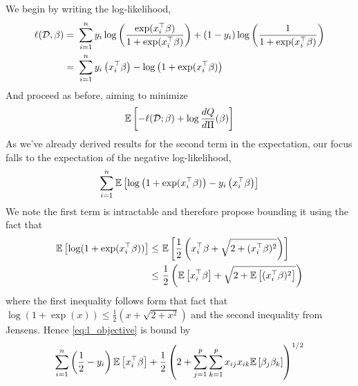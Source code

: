 \documentclass[12pt]{article}
\begin{document}
We begin by writing the log-likelihood,
\begin{align}
    \ell(\mathcal{D}, \beta) =&\ \sum_{i=1}^n 
    y_i \log \left( \frac{ \exp(x_i^\top \beta) }{ 1 + \exp( x_i^\top \beta ) } \right) +
    (1 - y_i) \log \left( \frac{ 1 }{ 1 + \exp( x_i^\top \beta ) } \right) \nonumber \\
    =&\ \sum_{i=1}^n  y_i \left( x_i^\top \beta \right) - \log \left(1 + \exp(x_i^\top \beta) \right)
\end{align}
And proceed as before, aiming to minimize
\begin{equation} \label{eq:l_opt_objective} 
    \mathbb{E} \left[ 
	- \ell(\mathcal{D}; \beta) + \log \frac{dQ}{d\Pi}(\beta) 
    \right]
\end{equation}
As we've already derived results for the second term in the expectation, our focus falls to the expectation of the negative log-likelihood,
\begin{equation} \label{eq:l_objective} 
    \sum_{i=1}^n  
    \mathbb{E} \left[
	    \log \left(1 + \exp(x_i^\top \beta) \right) -
	    y_i \left( x_i^\top \beta \right) 
    \right]
\end{equation}
We note the first term is intractable and therefore propose bounding it using the fact that
\begin{equation}
\begin{aligned}
    \mathbb{E} \left[ \log(1 + \exp(x_i^\top \beta)) \right]
    \leq &\
	\mathbb{E} \left[ 
	    \frac{1}{2} \left( x_i^\top \beta + 
	    \sqrt{2 + (x_i^\top \beta)^2} \right) 
	\right] \\
    \leq &\
	\frac{1}{2} \left( 
	    \mathbb{E} \left[ x_i^\top \beta \right] + 
	    \sqrt{2 + \mathbb{E} \left[(x_i^\top \beta)^2 \right]} 
	\right)
\end{aligned}
\end{equation}
where the first inequality follows form that fact that $ \log(1 + \exp(x)) \leq \frac{1}{2} \left( x + \sqrt{2 + x^2} \right) $ and the second inequality from Jensens. Hence \eqref{eq:l_objective} is bound by
\begin{equation}
    \sum_{i=1}^n
    \left( \frac{1}{2} - y_i \right) \mathbb{E} \left[ x_i^\top \beta \right] + 
    \frac{1}{2} \left( 2 + \sum_{j=1}^p \sum_{k=1}^p x_{ij} x_{ik} 
    \mathbb{E} \left[ \beta_j \beta_k \right] \right)^{1/2}
\end{equation}
\end{document}
